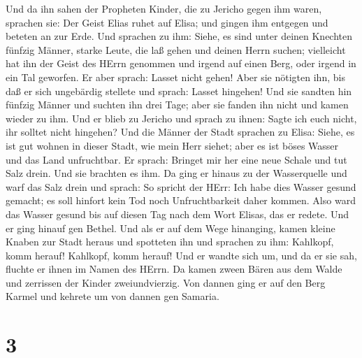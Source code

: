 Und da ihn sahen der Propheten Kinder, die zu Jericho gegen ihm waren,
sprachen sie: Der Geist Elias ruhet auf Elisa; und gingen ihm entgegen
und beteten an zur Erde.  Und sprachen zu ihm: Siehe, es
sind unter deinen Knechten fünfzig Männer, starke Leute, die laß gehen
und deinen Herrn suchen; vielleicht hat ihn der Geist des HErrn genommen
und irgend auf einen Berg, oder irgend in ein Tal geworfen. Er aber
sprach: Lasset nicht gehen!  Aber sie nötigten ihn, bis daß
er sich ungebärdig stellete und sprach: Lasset hingehen! Und sie sandten
hin fünfzig Männer und suchten ihn drei Tage; aber sie fanden ihn nicht
 und kamen wieder zu ihm. Und er blieb zu Jericho und
sprach zu ihnen: Sagte ich euch nicht, ihr solltet nicht hingehen?
 Und die Männer der Stadt sprachen zu Elisa: Siehe, es ist
gut wohnen in dieser Stadt, wie mein Herr siehet; aber es ist böses
Wasser und das Land unfruchtbar.  Er sprach: Bringet mir
her eine neue Schale und tut Salz drein. Und sie brachten es ihm.
 Da ging er hinaus zu der Wasserquelle und warf das Salz
drein und sprach: So spricht der HErr: Ich habe dies Wasser gesund
gemacht; es soll hinfort kein Tod noch Unfruchtbarkeit daher kommen.
 Also ward das Wasser gesund bis auf diesen Tag nach dem
Wort Elisas, das er redete.  Und er ging hinauf gen Bethel.
Und als er auf dem Wege hinanging, kamen kleine Knaben zur Stadt heraus
und spotteten ihn und sprachen zu ihm: Kahlkopf, komm herauf! Kahlkopf,
komm herauf!  Und er wandte sich um, und da er sie sah,
fluchte er ihnen im Namen des HErrn. Da kamen zween Bären aus dem Walde
und zerrissen der Kinder zweiundvierzig.  Von dannen ging
er auf den Berg Karmel und kehrete um von dannen gen Samaria.

\hypertarget{section-2}{%
\section{3}\label{section-2}}

